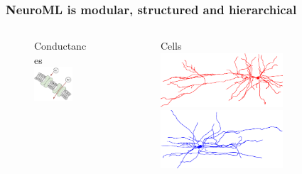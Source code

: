 \begin{frame}[c]
  \frametitle{NeuroML is modular, structured and hierarchical}
  \begin{columns}
    \begin{column}{0.3\textwidth}
      \begin{figure}[h]
        \centering
        Conductances\\
        \includegraphics[width=0.7\textwidth]{99_images/membrane2}\\\vspace{0.2cm}
      \end{figure}%
    \end{column}
    \begin{column}{0.3\textwidth}
      \begin{figure}[h]
        \centering
        Cells\\\vspace{-0.5cm}
        \includegraphics[width=0.7\textwidth,angle=-90]{99_images/HL23PYR-red}
        \includegraphics[width=0.7\textwidth,angle=-90]{99_images/HL23PV}

\end{figure}
\end{column}
\end{columns}
\end{frame}
